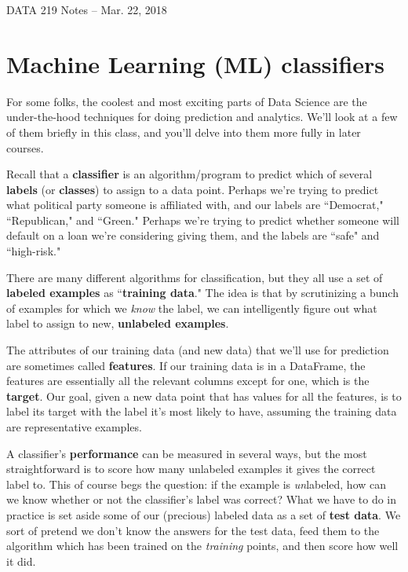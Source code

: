 \documentclass[12pt]{article}
\begin{document}
\begin{center}
\begin{Large}
DATA 219 Notes -- Mar. 22, 2018
\end{Large}
\end{center}

\section{Machine Learning (ML) classifiers}

For some folks, the coolest and most exciting parts of Data Science are the
under-the-hood techniques for doing prediction and analytics. We'll look at a
few of them briefly in this class, and you'll delve into them more fully in
later courses.

Recall that a \textbf{classifier} is an algorithm/program to predict which of
several \textbf{labels} (or \textbf{classes}) to assign to a data point.
Perhaps we're trying to predict what political party someone is affiliated
with, and our labels are ``Democrat," ``Republican," and ``Green." Perhaps
we're trying to predict whether someone will default on a loan we're
considering giving them, and the labels are ``safe" and ``high-risk."

There are many different algorithms for classification, but they all use a set
of \textbf{labeled examples} as ``\textbf{training data}." The idea is that by
scrutinizing a bunch of examples for which we \textit{know} the label, we can
intelligently figure out what label to assign to new, \textbf{unlabeled
examples}.

The attributes of our training data (and new data) that we'll use for
prediction are sometimes called \textbf{features}. If our training data is in
a DataFrame, the features are essentially all the relevant columns except for
one, which is the \textbf{target}. Our goal, given a new data point that has
values for all the features, is to label its target with the label it's most
likely to have, assuming the training data are representative examples. 

A classifier's \textbf{performance} can be measured in several ways, but the
most straightforward is to score how many unlabeled examples it gives the
correct label to. This of course begs the question: if the example is
\textit{un}labeled, how can we know whether or not the classifier's label was
correct? What we have to do in practice is set aside some of our (precious)
labeled data as a set of \textbf{test data}. We sort of pretend we don't know
the answers for the test data, feed them to the algorithm which has been
trained on the \textit{training} points, and then score how well it did.
\end{document}
